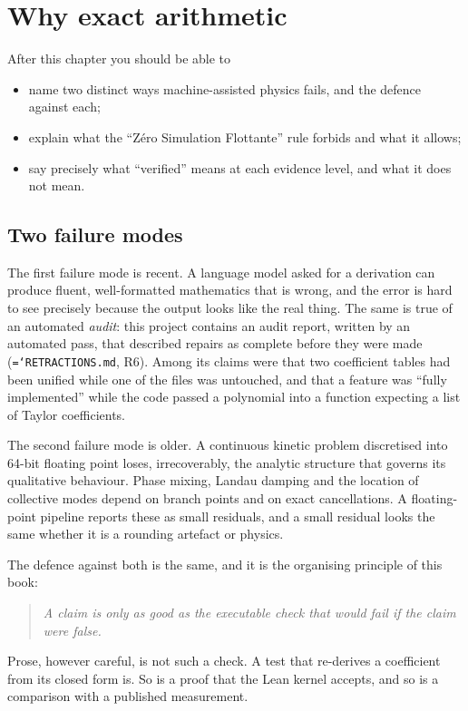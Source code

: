 \documentclass[11pt,a4paper,openany]{book}
\newcommand{\code}[1]{\texttt{\hyphenchar\font=`\-\relax #1}}
\theoremstyle{definition}
\theoremstyle{plain}
\begin{document}
\chapter{Why exact arithmetic}
\label{ch:exact}

\begin{objectives}
After this chapter you should be able to
\begin{itemize}
  \item name two distinct ways machine-assisted physics fails, and the defence against each;
  \item explain what the ``Z\'ero Simulation Flottante'' rule forbids and what it allows;
  \item say precisely what ``verified'' means at each evidence level, and what it does not mean.
\end{itemize}
\end{objectives}

\section{Two failure modes}

The first failure mode is recent. A language model asked for a derivation can produce fluent,
well-formatted mathematics that is wrong, and the error is hard to see precisely because the
output looks like the real thing. The same is true of an automated \emph{audit}: this project
contains an audit report, written by an automated pass, that described repairs as complete before
they were made (\code{RETRACTIONS.md}, R6). Among its claims were that two coefficient tables had
been unified while one of the files was untouched, and that a feature was ``fully implemented''
while the code passed a polynomial into a function expecting a list of Taylor coefficients.

The second failure mode is older. A continuous kinetic problem discretised into 64-bit floating
point loses, irrecoverably, the analytic structure that governs its qualitative behaviour. Phase
mixing, Landau damping and the location of collective modes depend on branch points and on exact
cancellations. A floating-point pipeline reports these as small residuals, and a small residual
looks the same whether it is a rounding artefact or physics.

The defence against both is the same, and it is the organising principle of this book:
\begin{quote}
\emph{A claim is only as good as the executable check that would fail if the claim were false.}
\end{quote}
Prose, however careful, is not such a check. A test that re-derives a coefficient from its closed
form is. So is a proof that the Lean kernel accepts, and so is a comparison with a published
measurement.
\end{document}
